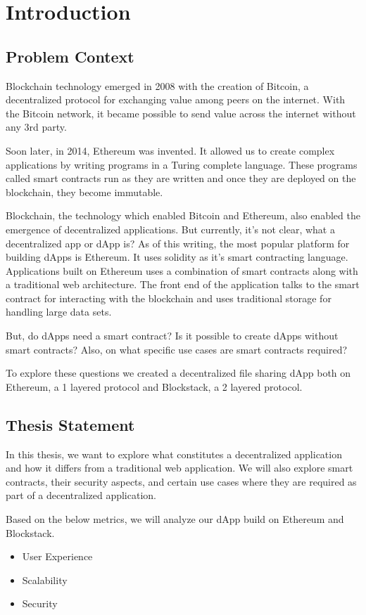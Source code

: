 \chapter{Introduction}\label{chapter::introduction}

\section{Problem Context}
Blockchain technology emerged in 2008 with the creation of Bitcoin, a decentralized protocol for exchanging value among peers on the internet. With the Bitcoin network, it became possible to send value across the internet without any 3rd party.

Soon later, in 2014, Ethereum was invented. It allowed us to create complex applications by writing programs in a Turing complete language. These programs called smart contracts run as they are written and once they are deployed on the blockchain, they become immutable.

Blockchain, the technology which enabled Bitcoin and Ethereum, also enabled the emergence of decentralized applications. But currently, it's not clear, what a decentralized app or dApp is? As of this writing, the most popular platform for building dApps is Ethereum. It uses solidity as it's smart contracting language. Applications built on Ethereum uses a combination of smart contracts along with a traditional web architecture. The front end of the application talks to the smart contract for interacting with the blockchain and uses traditional storage for handling large data sets.

But, do dApps need a smart contract? Is it possible to create dApps without smart contracts? Also, on what specific use cases are smart contracts required?

To explore these questions we created a decentralized file sharing dApp both on Ethereum, a 1 layered protocol and Blockstack, a 2 layered protocol. 

\section{Thesis Statement}
In this thesis, we want to explore what constitutes a decentralized application and how it differs from a traditional web application. We will also explore smart contracts, their security aspects, and certain use cases where they are required as part of a decentralized application.

Based on the below metrics, we will analyze our dApp build on Ethereum and Blockstack.
\begin{itemize}
	\item User Experience
	\item Scalability
	\item Security
\end{itemize}

